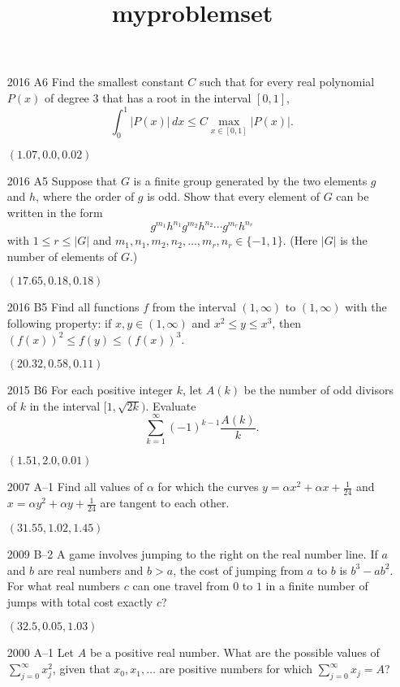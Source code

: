 \documentclass{article}
\begin{document}
\title{myproblemset}
\maketitle
\newcommand{\RR}{\mathbb{R}}
\begin{itemize}\item[2016 A6]
Find the smallest constant $C$ such that for every real polynomial $P(x)$ of degree 3 that has a root in the interval $[0,1]$,
\[
\int_0^1 \left| P(x) \right|\,dx \leq C \max_{x \in [0,1]} \left| P(x) \right|.
\]


$(1.07,0.0,0.02)$
\item[2016 A5]
Suppose that $G$ is a finite group generated by the two elements $g$ and $h$, where the order of $g$ is odd. Show that every element of $G$ can be written in the form
\[
g^{m_1} h^{n_1} g^{m_2} h^{n_2} \cdots g^{m_r} h^{n_r}
\]
with $1 \leq r \leq |G|$ and $m_1, n_1, m_2, n_2, \ldots, m_r, n_r \in \{-1, 1\}$. 
(Here $|G|$ is the number of elements of $G$.)


$(17.65,0.18,0.18)$
\item[2016 B5]
Find all functions $f$ from the interval $(1, \infty)$ to $(1, \infty)$ with the following property:
if $x,y \in (1, \infty)$ and $x^2 \leq y \leq x^3$, then $(f(x))^2 \leq f(y) \leq (f(x))^3$.


$(20.32,0.58,0.11)$
\item[2015 B6]
For each positive integer $k$, let $A(k)$ be the number of odd divisors of $k$ in the interval $[1, \sqrt{2k})$. Evaluate
\[
\sum_{k=1}^\infty (-1)^{k-1} \frac{A(k)}{k}.
\]


$(1.51,2.0,0.01)$
\item[2007 A--1]
Find all values of $\alpha$ for which the curves $y = \alpha x^2 +
\alpha x + \frac{1}{24}$ and $x = \alpha y^2 + \alpha y + \frac{1}{24}$
are tangent to each other.


$(31.55,1.02,1.45)$
\item[2009 B--2]
A game involves jumping to the right on the real number line. If $a$ and $b$ are real numbers
and $b > a$, the cost of jumping from $a$ to $b$ is $b^3-ab^2$. For what real numbers
$c$ can one travel from $0$ to $1$ in a finite number of jumps with total cost exactly $c$?


$(32.5,0.05,1.03)$
\item[2000 A--1]
Let $A$ be a positive real number.  What are the possible values of
$\sum_{j=0}^\infty x_j^2$, given that $x_0,x_1,\ldots$ are positive
numbers
for which $\sum_{j=0}^\infty x_j=A$?



\end{itemize}
\end{document}
